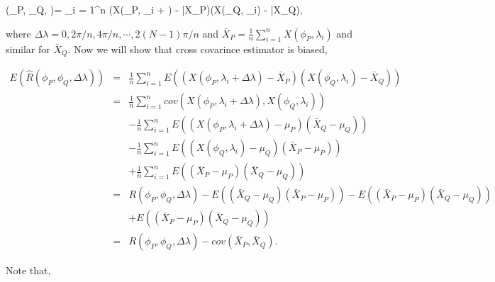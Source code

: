 	
		
	\beq
	(\phi_P, \phi_Q, \Delta \lambda)= \sum_{i = 1}^n (X(\phi_P, \lambda_i + \Delta \lambda) - \bar{X}_P)(X(\phi_Q, \lambda_i) - \bar{X}_Q), 
	\eeq
	
	where $\Delta \lambda = 0, 2\pi/n, 4\pi/n, \cdots, 2(N-1)\pi/n$ and $\bar{X}_P = \frac{1}{n}\sum_{i=1}^n X(\phi_P, \lambda_i)$ and similar for $\bar{X}_Q$. Now we will show that cross covarince estimator is biased, 
	
	\begin{eqnarray*}
		E(\hat{R}(\phi_P, \phi_Q, \Delta \lambda)) &=& \frac{1}{n}\sum_{i = 1}^n E((X(\phi_P, \lambda_i + \Delta \lambda) - \bar{X}_P)(X(\phi_Q, \lambda_i) - \bar{X}_Q)) \\
		&=& \frac{1}{n}\sum_{i=1}^n cov(X(\phi_P, \lambda_i+\Delta \lambda), X(\phi_Q, \lambda_i)) \\
		& & - \frac{1}{n}\sum_{i = 1}^n E((X(\phi_P, \lambda_i + \Delta \lambda) - \mu_P)(\bar{X}_Q - \mu_Q)) \\
		& & -\frac{1}{n}\sum_{i = 1}^n E((X(\phi_Q, \lambda_i) - \mu_Q)(\bar{X}_P - \mu_P)) \\
		& & + \frac{1}{n}\sum_{i = 1}^n E((\bar{X}_P - \mu_P)(\bar{X}_Q - \mu_Q)) \\
		&=& R(\phi_P, \phi_Q, \Delta \lambda) -E((\bar{X}_Q - \mu_Q)(\bar{X}_P - \mu_P)) - E((\bar{X}_P - \mu_P)(\bar{X}_Q - \mu_Q)) \\
		& &  + E((\bar{X}_P - \mu_P)(\bar{X}_Q - \mu_Q)) \\
		&=& R(\phi_P, \phi_Q, \Delta \lambda) - cov(\bar{X}_P, \bar{X}_Q).
	\end{eqnarray*}
	
	Note that, 
	

